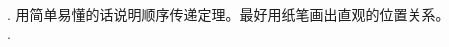 \documentclass[12pt,UTF8]{ctexbook}
\begin{document}
\begin{appendix}
\begin{sk}
    \mbox{} \\
    . 用简单易懂的话说明顺序传递定理。最好用纸笔画出直观的位置关系。\\
    . 
\end{sk}

\end{appendix}
\end{document}
